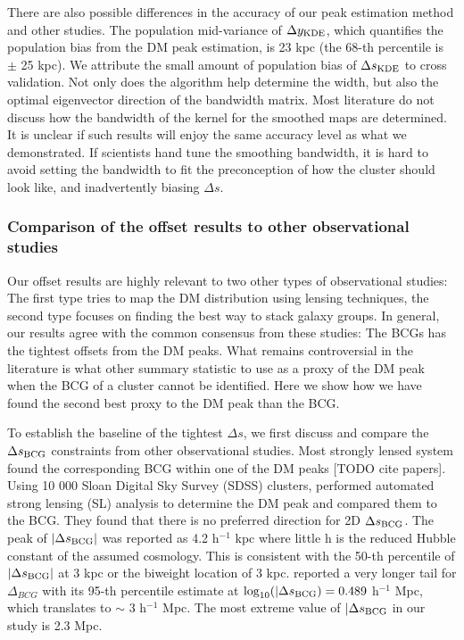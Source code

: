 There are also possible differences in the accuracy of our peak
estimation method and other studies. 
The population mid-variance of $\Delta y_{\rm KDE}$, which quantifies the
population bias from the DM peak estimation, is 23 kpc (the 68-th percentile is
$\pm$ 25 kpc).
We attribute the small amount of population bias of $\Delta s_{\rm KDE}$ 
to cross validation. Not only does the algorithm help
determine the width, but also the optimal eigenvector direction of 
the bandwidth matrix. 
Most literature do not discuss how the bandwidth of 
the kernel for the smoothed maps are determined.  
It is unclear if such results will enjoy the same accuracy level as what
we demonstrated. 
If scientists hand tune the smoothing bandwidth, it is hard to
avoid setting the bandwidth to fit the preconception of how the cluster 
should look like, and inadvertently biasing $\Delta s$.

\subsubsection{Comparison of the offset results to other observational studies}
Our offset results are highly relevant to two other types of
observational studies: 
The first type tries to map the DM distribution using lensing techniques,  
the second type focuses on finding the best way to stack galaxy groups.
In general, our results agree with the common consensus from these studies: 
The BCGs has the tightest offsets from the DM peaks.
What remains controversial in the literature is what other summary statistic 
to use as a proxy of the DM peak when the BCG of a cluster cannot be
identified. Here we show how we have found the second best proxy to the DM
peak than the BCG.  

To establish the baseline of the tightest $\Delta s$, we first discuss and 
compare the $\Delta s_{\rm BCG}$ constraints from other observational studies.   
Most strongly lensed system found the corresponding BCG within one of the DM 
peaks [TODO cite papers]. 
Using 10 000 Sloan Digital Sky Survey (SDSS) clusters, \cite{Zitrin2012}
performed automated strong lensing (SL) analysis to determine the DM peak and
compared them to the BCG. They  
found that there is no preferred direction for 2D $\Delta s_{\rm BCG}$. The peak
of $|\Delta s_{\rm BCG}|$ was reported as 4.2 h$^{-1}$ kpc where 
little h is the reduced Hubble constant of the assumed cosmology. 
This is consistent with the 50-th percentile of $|\Delta s_{\rm BCG}|$ at 3 kpc
or the biweight location of 3 kpc.  
\cite{Zitrin2012} reported a very longer tail for $\Delta_{BCG}$ with its 95-th
percentile estimate at $\log_{10}(|\Delta s_{\rm BCG}) = 0.489$ h$^{-1}$ Mpc, which
translates to $\sim$ 3 h$^{-1}$ Mpc. The most extreme value of $|\Delta s_{\rm BCG}$
in our study is 2.3 Mpc.  


